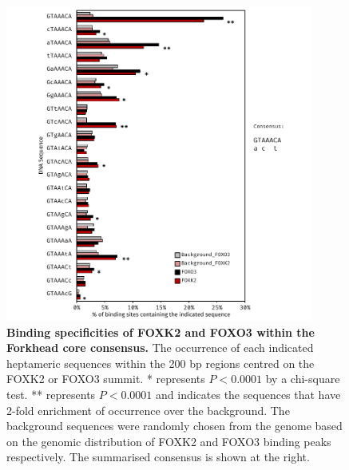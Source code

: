 \begin{figure}[!ht]
    \centering
    \includegraphics[width=0.9\textwidth]{chapter3/figures_foxo3/fig45.pdf}
    \caption[Binding specificities of FOXK2 and FOXO3 within the Forkhead core consensus]{\textbf{Binding specificities of FOXK2 and FOXO3 within the Forkhead core consensus.} The occurrence of each indicated heptameric sequences within the 200 bp regions centred on the FOXK2 or FOXO3 summit. * represents $P<0.0001$ by a chi-square test. ** represents $P<0.0001$ and indicates the sequences that have 2-fold enrichment of occurrence over the background. The background sequences were randomly chosen from the genome based on the genomic distribution of FOXK2 and FOXO3 binding peaks respectively. The summarised consensus is shown at the right.}
    \label{fig:fig45}
\end{figure}

